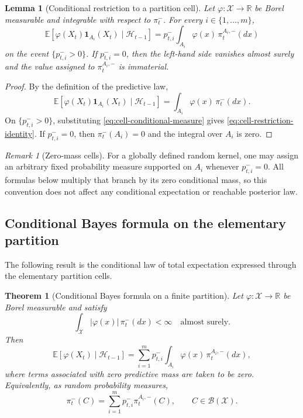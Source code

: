 \documentclass[10pt,twocolumn]{article}
\newtheorem{theorem}{Theorem}
\newtheorem{lemma}{Lemma}
\theoremstyle{remark}
\newtheorem{remark}{Remark}
\newcommand{\R}{\mathbb{R}}
\newcommand{\E}{\mathbb{E}}
\newcommand{\B}{\mathcal{B}}
\newcommand{\Hh}{\mathcal{H}}
\newcommand{\Xcal}{\mathcal{X}}
\newcommand{\one}{\mathbf{1}}
\begin{document}
\begin{lemma}[Conditional restriction to a partition cell]
	\label{lem:cell-restriction}
	Let $\varphi:\Xcal\to\R$ be Borel measurable and integrable with respect to $\pi_t^{-}$. For every $i\in\{1,\ldots,m\}$,
	\begin{equation}
		\E\!\left[
		\varphi(X_t)\one_{A_i}(X_t)
		\mid\Hh_{t-1}
		\right]
		=p_{t,i}^{-}
		\int_{A_i}\varphi(x)\,\pi_t^{A_i,-}(dx)
		\label{eq:cell-restriction-identity}
	\end{equation}
	on the event $\{p_{t,i}^{-}>0\}$. If $p_{t,i}^{-}=0$, then the left-hand side vanishes almost surely and the value assigned to $\pi_t^{A_i,-}$ is immaterial.
\end{lemma}

\begin{proof}
	By the definition of the predictive law,
	\[
	\E\!\left[
	\varphi(X_t)\one_{A_i}(X_t)\mid\Hh_{t-1}
	\right]
	=
	\int_{A_i}\varphi(x)\,\pi_t^{-}(dx).
	\]
	On $\{p_{t,i}^{-}>0\}$, substituting \cref{eq:cell-conditional-measure} gives \cref{eq:cell-restriction-identity}. If $p_{t,i}^{-}=0$, then $\pi_t^{-}(A_i)=0$ and the integral over $A_i$ is zero.
\end{proof}

\begin{remark}[Zero-mass cells]
	\label{rem:zero-mass-cells}
	For a globally defined random kernel, one may assign an arbitrary fixed probability measure supported on $A_i$ whenever $p_{t,i}^{-}=0$. All formulas below multiply that branch by its zero conditional mass, so this convention does not affect any conditional expectation or reachable posterior law.
\end{remark}

\subsection{Conditional Bayes formula on the elementary partition}
\label{subsec:bayes-elementary-partition}

The following result is the conditional law of total expectation expressed through the elementary partition cells.

\begin{theorem}[Conditional Bayes formula on a finite partition]
	\label{thm:bayes-finite-partition}
	Let $\varphi:\Xcal\to\R$ be Borel measurable and satisfy
	\[
	\int_{\Xcal}|\varphi(x)|\,\pi_t^{-}(dx)<\infty
	\quad\text{almost surely}.
	\]
	Then
	\begin{equation}
		\E[\varphi(X_t)\mid\Hh_{t-1}]
		=
		\sum_{i=1}^{m}p_{t,i}^{-}
		\int_{A_i}\varphi(x)\,\pi_t^{A_i,-}(dx),
		\label{eq:bayes-finite-partition}
	\end{equation}
	where terms associated with zero predictive mass are taken to be zero. Equivalently, as random probability measures,
	\begin{equation}
		\pi_t^{-}(C)
		=
		\sum_{i=1}^{m}p_{t,i}^{-}\pi_t^{A_i,-}(C),
		\qquad C\in\B(\Xcal).
		\label{eq:predictive-cell-mixture}
	\end{equation}
\end{theorem}
\end{document}
